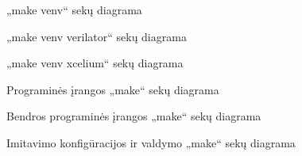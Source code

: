 \begin{figure}[H]
	
	\caption{„make venv“ sekų diagrama}
	\label{fig:uml_seq_venv}
\end{figure}

\begin{figure}[H]
	
	\caption{„make venv verilator“ sekų diagrama}
	\label{fig:uml_seq_venv_verilator}
\end{figure}

\begin{figure}[H]
	
	\caption{„make venv xcelium“ sekų diagrama}
	\label{fig:uml_seq_venv_xcelium}
\end{figure}

\begin{figure}[H]
	
	\caption{Programinės įrangos „make“ sekų diagrama}
	\label{fig:uml_seq_sw_make}
\end{figure}

\begin{figure}[H]
	
	\caption{Bendros  programinės įrangos „make“ sekų diagrama}
	\label{fig:uml_seq_sw_comm_make}
\end{figure}

\begin{figure}[H]
	
	\caption{Imitavimo konfigūracijos ir valdymo „make“ sekų diagrama}
	\label{fig:uml_seq_sim_make}
\end{figure}


